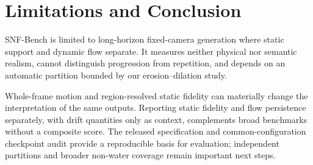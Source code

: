 
\section{Limitations and Conclusion}
\label{sec:limitations}

SNF-Bench is limited to long-horizon fixed-camera generation where static support and dynamic flow separate. It measures neither physical nor semantic realism, cannot distinguish progression from repetition, and depends on an automatic partition bounded by our erosion--dilation study.

Whole-frame motion and region-resolved static fidelity can materially change the interpretation of the same outputs. Reporting static fidelity and flow persistence separately, with drift quantities only as context, complements broad benchmarks without a composite score. The released specification and common-configuration checkpoint audit provide a reproducible basis for evaluation; independent partitions and broader non-water coverage remain important next steps.
